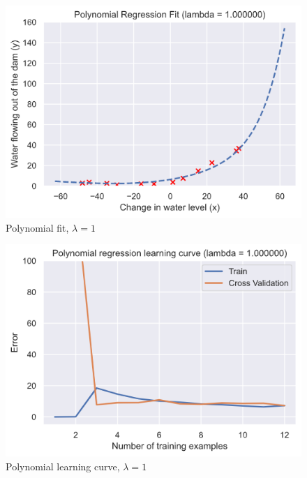 \documentclass[12pt]{article}
\begin{document}
\begin{figure}[h!]
  \centering
  \includegraphics[scale=0.6]{polyfit1.png}
  \caption{Polynomial fit, $\lambda = 1$}
  \label{fig:polyfit1}
\end{figure}

\begin{figure}[h!]
  \centering
  \includegraphics[scale=0.6]{polycurve1.png}
  \caption{Polynomial learning curve, $\lambda = 1$}
  \label{fig:polycurve1}
\end{figure}
\end{document}
